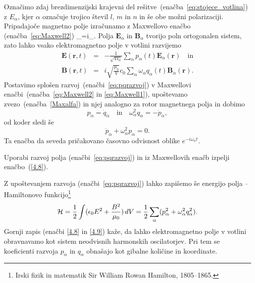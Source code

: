 Označimo zdaj brezdimenzijski krajevni del rešitve~(enačba~\ref{eq:stojece_votlina}) z 
$E_{\alpha}$, kjer $\alpha$
označuje trojico števil $l$, $m$ in $n$ in še obe možni polarizaciji. 
Pripadajoče magnetno polje izračunamo z Maxwellovo enačbo (enačba~\ref{eq:Maxwell2}) 
\beq
\nabla\times{}_{\alpha}=i\omega{}_{\alpha}.
\label{Maxalfa}
\eeq
Polja $\mathbf{E}_{\alpha}$ in $\mathbf{B}_{\alpha}$ tvorijo poln ortogonalen
sistem, zato lahko vsako elektromagnetno polje v votlini razvijemo
\begin{eqnarray}
\mathbf{E}(\mathbf{r},t) & = & -\frac{1}{\sqrt{V\epsilon_{0}}}
\sum_{\alpha}p_{\alpha}(t)\mathbf{E}_{\alpha}(\mathbf{r}) \quad \mathrm{in}\nonumber \\
\mathbf{B}(\mathbf{r},t) & = & i\sqrt{\frac{\mu_{0}}{V}}c_0\sum_{\alpha}
\omega_{\alpha}q_{\alpha}(t)\mathbf{B}_{\alpha}(\mathbf{r}).
\label{eq:pqrazvoj}
\end{eqnarray}
Postavimo splošen razvoj~(enačbi~\ref{eq:pqrazvoj}) v Maxwellovi enačbi~(enačba~\ref{eq:Maxwell2}
in \ref{eq:Maxwell1}), upoštevamo zvezo~(enačba~\ref{Maxalfa}) in njej analogno za rotor magnetnega polja
in dobimo 
\begin{equation}
p_{\alpha}=\dot{q}_{\alpha} \quad \mathrm{in} \quad 
\omega_{\alpha}^{2}q_{\alpha}=-\dot{p}_{\alpha},
\label{4.7}
\end{equation}
od koder sledi še 
\begin{equation}
\ddot{p}_{\alpha}+\omega_{\alpha}^{2}p_{\alpha}=0.
\label{4.8}
\end{equation}
Ta enačba da seveda pričakovano časovno odvisnost oblike $e^{-i \omega_\alpha t}$.

\begin{definition}
 Uporabi razvoj polja (enačbi~\ref{eq:pqrazvoj}) in iz Maxwellovih enačb izpelji
 enačbo~(\ref{4.8}).
\end{definition}

Z upoštevanjem razvoja (enačbi~\ref{eq:pqrazvoj}) lahko zapišemo še energijo 
polja -- Hamiltonovo 
funkcijo\footnote{Irski fizik in matematik Sir William Rowan Hamilton, 1805--1865.}
\begin{equation}
{\cal H}=\frac{1}{2}\int(\epsilon_{0}E^{2}+\frac{B^{2}}{\mu_0})\, 
dV=\frac{1}{2}\sum_{\alpha}(p_{\alpha}^{2}+\omega_{\alpha}^{2}q_{\alpha}^{2}).
\label{4.9}
\end{equation}
Gornji zapis (enačbi \ref{4.8} in \ref{4.9}) kaže, 
da lahko elektromagnetno polje v votlini
obravnavamo kot sistem neodvisnih harmonskih oscilatorjev. 
Pri tem se koeficienti razvoja $p_{\alpha}$ in $q_{\alpha}$ obnašajo kot
gibalne količine in koordinate. 

